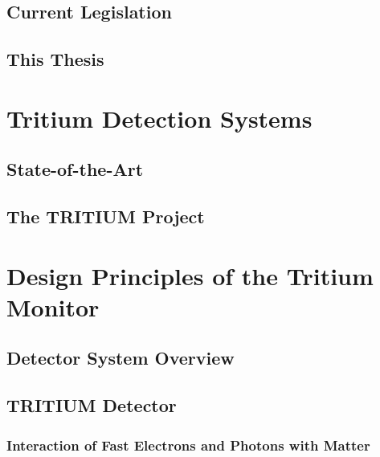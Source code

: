 \documentclass[12pt,a4paper]{book}
\begin{document}
	\section{Current Legislation}\label{sec:Legislation}
	 
	
	\section{This Thesis}\label{sec:ThisThesis}
	
	\newpage
	
\chapter{Tritium Detection Systems}\label{chap:TritiumDetection}
	
	\section{State-of-the-Art}\label{sec:StateOfTheArt}
	
	
	\section{The TRITIUM Project}\label{sec:TritiumProject}
	
	\newpage	
	
\chapter[TRITIUM Design Principles]{Design Principles of the Tritium Monitor}\label{chap:DesignPrinciples}
	\section{Detector System Overview}\label{sec:MonitorOverview}
	 
	
	\section{TRITIUM Detector}\label{sec:TritiumDectectorIntro}
	 
	
		\subsection[Interaction of Particles with Matter]{Interaction of Fast Electrons and Photons with Matter}\label{subsec:Interaction}
		 
					
\end{document}
